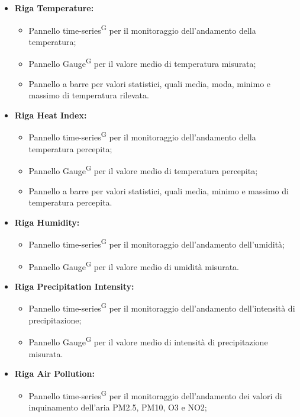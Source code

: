 \documentclass[8pt]{article}
\newcommand{\glossterm}[1]{#1\textsuperscript{G}} %
\begin{document}
\begin{itemize}
	\setlength\itemsep{0em}
    \item \textbf{Riga Temperature:}
    \begin{itemize}
	\setlength\itemsep{0em}
        \item Pannello \glossterm{time-series} per il monitoraggio dell'andamento della temperatura;
        \item Pannello \glossterm{Gauge} per il valore medio di temperatura misurata;
        \item Pannello a barre per valori statistici, quali media, moda, minimo e massimo di temperatura rilevata.
    \end{itemize}
    \item \textbf{Riga Heat Index:}
    \begin{itemize}
	\setlength\itemsep{0em}
        \item Pannello \glossterm{time-series} per il monitoraggio dell'andamento della temperatura percepita;
        \item Pannello \glossterm{Gauge} per il valore medio di temperatura percepita;
        \item Pannello a barre per valori statistici, quali media, minimo e massimo di temperatura percepita.
    \end{itemize}
    \item \textbf{Riga Humidity:}
    \begin{itemize}
	\setlength\itemsep{0em}
        \item Pannello \glossterm{time-series} per il monitoraggio dell'andamento dell'umidità;
        \item Pannello \glossterm{Gauge} per il valore medio di umidità misurata.
    \end{itemize}
    \item \textbf{Riga Precipitation Intensity:}
    \begin{itemize}
	\setlength\itemsep{0em}
        \item Pannello \glossterm{time-series} per il monitoraggio dell'andamento dell'intensità di precipitazione;
        \item Pannello \glossterm{Gauge} per il valore medio di intensità di precipitazione misurata.
    \end{itemize}
    \item \textbf{Riga Air Pollution:}
    \begin{itemize}
	\setlength\itemsep{0em}
        \item Pannello \glossterm{time-series} per il monitoraggio dell'andamento dei valori di inquinamento dell'aria PM2.5, PM10, O3 e NO2;

\end{itemize}
\end{itemize}
\end{document}
